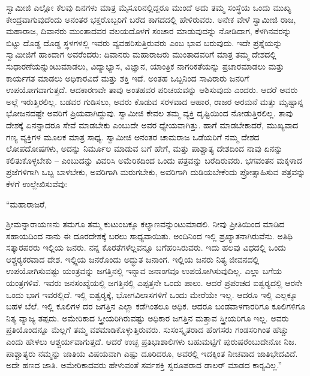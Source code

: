  ಸ್ವಾಮೀಜಿ ಎಲ್ಲೋ ಕೆಲವು ದಿನಗಳು ಮಾತ್ರ ಮೈಸೂರಿನಲ್ಲಿದ್ದರೂ ಮುಂದೆ ಅದು ತಮ್ಮ ಸಂಸ್ಥೆಯ ಒಂದು ಮುಖ್ಯ ಕೇಂದ್ರವಾಗುವುದೆಂದು ಅನಂತರ ಭಕ್ತರೊಬ್ಬರಿಗೆ ಬರೆದ ಕಾಗದದಲ್ಲಿ ಹೇಳಿರುವರು. ಅನೇಕ ವೇಳೆ ಸ್ವಾಮೀಜಿ ರಾಜ, ಮಹಾರಾಜ, ದಿವಾನರು ಮುಂತಾದವರ ವಲಯದೊಳಗೆ ಸಂಚಾರ ಮಾಡುವುದನ್ನು ನೋಡಿದಾಗ, ಕೆಳಗಿನವರನ್ನು ಬಿಟ್ಟು ದೊಡ್ಡ ದೊಡ್ಡ ಸ್ಥಳಗಳಲ್ಲಿ ಇವರು ವ್ಯವಹರಿಸುತ್ತಿರುವರು ಎಂಬ ಭಾವ ಬರುವುದು. ಇದೇ ಪ್ರಶ್ನೆಯನ್ನು ಸ್ವಾಮೀಜಿಗೆ ಹಾಕಿದಾಗ ಅವರೆಂದರು: ದಿವಾನರು ಮಹಾರಾಜರು ಮುಂತಾದವರಿಗೆ ಮಾತ್ರ ತಮ್ಮ ದೇಶದಲ್ಲಿ ಸುಧಾರಣೆಯನ್ನುಂಟುಮಾಡಲು, ವಿದ್ಯಾಭ್ಯಾಸ, ವಿಜ್ಞಾನ, ಯಾಂತ್ರಿಕ ನಾಗರಿಕತೆಯನ್ನು ಪ್ರಚಾರಮಾಡಲು ಮತ್ತು ಕಾರ್ಯಗತ ಮಾಡಲು ಅಧಿಕಾರವಿದೆ ಮತ್ತು ಶಕ್ತಿ ಇದೆ. ಅಂತಹ ಒಬ್ಬನಿಂದ ಸಾವಿರಾರು ಜನರಿಗೆ ಉಪಯೋಗವಾಗುತ್ತದೆ. ಆದಕಾರಣವೇ ತಾವು ಅಂತಹವರ ಪರಿಚಯವನ್ನು ಆಶಿಸುವುದು ಎಂದರು. ಆದರೆ ಅವರು ಅಲ್ಲೆ ಇರುತ್ತಿರಲಿಲ್ಲ. ಬಡವರ ಗುಡಿಸಲು, ಅವರು ಕೊಡುವ ಸರಳವಾದ ಆಹಾರ, ರಾಜರ ಅರಮನೆ ಮತ್ತು ಮೃಷ್ಟಾನ್ನ ಭೋಜನದಷ್ಟೇ ಅವರಿಗೆ ಪ್ರಿಯವಾಗಿದ್ದುವು. ಸ್ವಾಮೀಜಿ ಕೇವಲ ತಮ್ಮ ವ್ಯಕ್ತಿ ದೃಷ್ಟಿಯಿಂದ ನೋಡುತ್ತಿರಲಿಲ್ಲ. ತಾವು ದೇಶಕ್ಕೆ ಏನನ್ನಾದರೂ ಸೇವೆ ಮಾಡಬೇಕು ಎಂಬುದೇ ಅವರ ಧ್ಯೇಯವಾಗಿತ್ತು. ಹಾಗೆ ಮಾಡಬೇಕಾದರೆ, ಮುಖ್ಯವಾದ ಗಣ್ಯ ವ್ಯಕ್ತಿಗಳ ಮೂಲಕ ಮಾತ್ರ ಸಾಧ್ಯ. ಸ್ವಾಮೀಜಿ ಅನಂತರ ಚಾಮರಾಜ ಒಡೆಯರಿಗೆ ನಮ್ಮ ದೇಶದ ಲೋಪದೋಷಗಳು, ಅದನ್ನು ನಿರ್ಮೂಲ ಮಾಡುವ ಬಗೆ ಹೇಗೆ, ಮತ್ತು ಪಾಶ್ಚಾತ್ಯ ದೇಶದಿಂದ ನಾವು ಏನನ್ನು ಕಲಿತುಕೊಳ್ಳಬೇಕು – ಎಂಬುದನ್ನು ವಿವರಿಸಿ ಅಮೆರಿಕದಿಂದ ಒಂದು ಪತ್ರವನ್ನು ಬರೆದಿರುವರು. ಭಗವಂತನ ಮಕ್ಕಳಾದ ಪ್ರಜೆಗಳಿಗಾಗಿ ಒಬ್ಬ ಬಾಳಬೇಕು, ಅವರಿಗಾಗಿ ಮರುಗಬೇಕು, ಅವರಿಗಾಗಿ ದುಡಿಯಬೇಕೆಂದು ಪ್ರೋತ್ಸಾಹಿಸುವ ಪತ್ರವನ್ನು ಕೆಳಗೆ ಉಲ್ಲೇಖಿಸುವೆವು: 

 “ಮಹಾರಾಜರೆ, 

 ಶ‍್ರೀಮನ್ನಾರಾಯಣನು ತಮಗೂ ತಮ್ಮ ಕುಟುಂಬಕ್ಕೂ ಕಲ್ಯಾಣವನ್ನುಂಟುಮಾಡಲಿ. ನೀವು ಪ್ರೀತಿಯಿಂದ ಮಾಡಿದ ಸಹಾಯದಿಂದ ನಾನು ಈ ದೂರದೇಶಕ್ಕೆ ಬರಲು ಸಾಧ್ಯವಾಯಿತು. ಅಂದಿನಿಂದ ಇಲ್ಲಿ ಪ್ರಖ್ಯಾತನಾಗಿರುವೆನು. ಅತಿಥಿ ಸತ್ಕಾರಪರರು ಇಲ್ಲಿಯ ಜನರು. ನನ್ನ ಕೊರತೆಗಳೆಲ್ಲವನ್ನೂ ಬಗೆಹರಿಸಿರುವರು. ಇದು ಹಲವು ವಿಧದಲ್ಲಿ ಒಂದು ಆಶ್ಚರ‍್ಯಕರವಾದ ದೇಶ. ಇಲ್ಲ್ಲಿಯ ಜನರೊಂದು ಅದ್ಭುತ ಜನಾಂಗ. ಇಲ್ಲಿಯ ಜನರು ನಿತ್ಯ ಜೀವನದಲ್ಲಿ ಉಪಯೋಗಿಸುವಷ್ಟು ಯಂತ್ರವನ್ನು ಜಗತ್ತಿನಲ್ಲಿ ಇನ್ನಾವ ಜನಾಂಗವೂ ಉಪಯೋಗಿಸುವುದಿಲ್ಲ. ಎಲ್ಲಾ ಬಗೆಯ ಯಂತ್ರಗಳಿವೆ. ಇವರು ಜನಸಂಖ್ಯೆಯಲ್ಲಿ ಜಗತ್ತಿನಲ್ಲಿ ಎಪ್ಪತ್ತನೇ ಒಂದು ಪಾಲು. ಆದರೆ ಪ್ರಪಂಚದ ಐಶ್ವರ‍್ಯದಲ್ಲಿ ಆರನೇ ಒಂದು ಭಾಗ ಇವರಲ್ಲಿದೆ. ಇಲ್ಲಿ ಐಶ್ವರ‍್ಯಕ್ಕೆ, ಭೋಗವಿಲಾಸಗಳಿಗೆ ಒಂದು ಮೇರೆಯೇ ಇಲ್ಲ. ಆದರೂ ಇಲ್ಲಿ ಎಲ್ಲಕ್ಕೂ ಬಹಳ ಬೆಲೆ. ಇಲ್ಲಿ ಕೂಲಿಗಳ ದರ ಜಗತ್ತಿನ ಎಲ್ಲಾ ಕಡೆಗಿಂತಲೂ ಅಧಿಕ. ಆದರೂ ಬಂಡವಾಳಗಾರರಿಗೂ ಕೂಲಿಗಳಿಗೂ ನಿತ್ಯ ವ್ಯಾಜ್ಯ ತಪ್ಪದು. ಅಮೇರಿಕಾದ ಸ್ತ್ರೀಯರಿಗಿರುವಷ್ಟು ಅಧಿಕಾರ ಜಗತ್ತಿನ ಮತ್ತಾವ ಸ್ತ್ರೀಯರಿಗೂ ಇಲ್ಲ. ಅವರು ಪ್ರತಿಯೊಂದನ್ನೂ ಮೆಲ್ಲಗೆ ತಮ್ಮ ವಶಮಾಡಿಕೊಳ್ಳುತ್ತಿರುವರು. ಸುಸಂಸ್ಕೃತರಾದ ಹೆಂಗಸರು ಗಂಡಸರಿಗಿಂತ ಹೆಚ್ಚು ಎಂದು ಹೇಳಲು ಆಶ್ಚರ್ಯವಾಗುತ್ತದೆ. ಆದರೆ ಉಚ್ಛ ಪ್ರತಿಭಾಶಾಲಿಗಳು ಬಹುಮಟ್ಟಿಗೆ ಪುರುಷರೆಂಬುದೇನೋ ನಿಜ. ಪಾಶ್ಚಾತ್ಯರು ನಮ್ಮನ್ನು ಜಾತಿಯ ವಿಷಯವಾಗಿ ಎಷ್ಟು ದೂರಿದರೂ, ಅವರಲ್ಲಿ ಇದಕ್ಕಿಂತ ನೀಚವಾದ ಜಾತಿಭೇದವಿದೆ. ಅದೇ ಹಣದ ಜಾತಿ. ಅಮೇರಿಕಾದವರು ಹೇಳುವಂತೆ ಸರ್ವಶಕ್ತಿ ಸ್ವರೂಪರಾದ ಡಾಲರ್ ಮಾಡದ ಕಾರ‍್ಯವಿಲ್ಲ.” 

